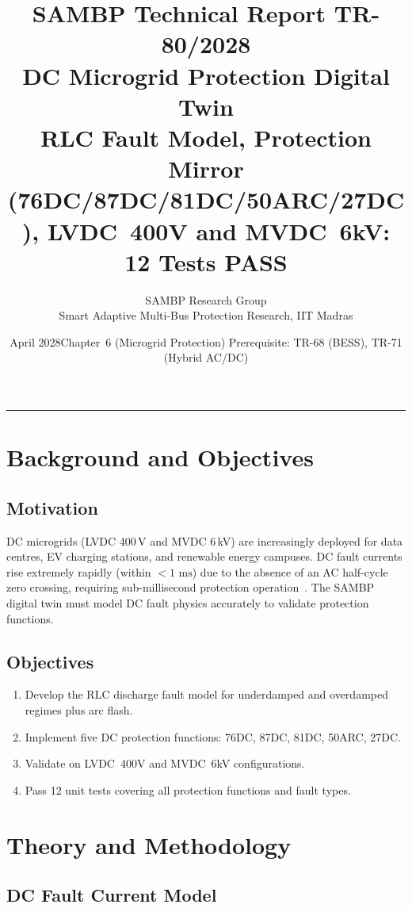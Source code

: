 \documentclass[11pt, a4paper]{article}
\title{\textbf{\textsf{\color{sambpblue}SAMBP Technical Report TR-80/2028}}\\[6pt]
  \Large DC Microgrid Protection Digital Twin\\[4pt]
  \normalsize RLC Fault Model, Protection Mirror (76DC/87DC/81DC/50ARC/27DC),
  LVDC~400V and MVDC~6kV: 12 Tests PASS}
\author{SAMBP Research Group\\[2pt]
  \small Smart Adaptive Multi-Bus Protection Research, IIT Madras}
\date{April 2028\quad\textbar\quad Chapter~6 (Microgrid Protection)\quad\textbar\quad
  Prerequisite: TR-68 (BESS), TR-71 (Hybrid AC/DC)}
\newcommand{\ms}{\,\text{ms}}
\begin{document}
\maketitle
\tableofcontents
\vspace{6pt}\hrule\vspace{10pt}

\section{Background and Objectives}
\label{sec:background}

\subsection{Motivation}

DC microgrids (LVDC 400\,V and MVDC 6\,kV) are increasingly deployed for
data centres, EV charging stations, and renewable energy campuses.
DC fault currents rise extremely rapidly (within $< 1\,\ms$) due to the
absence of an AC half-cycle zero crossing, requiring sub-millisecond
protection operation~\cite{Dragicevic2016}. The SAMBP digital twin must
model DC fault physics accurately to validate protection functions.

\subsection{Objectives}

\begin{enumerate}
  \item Develop the RLC discharge fault model for underdamped and overdamped
    regimes plus arc flash.
  \item Implement five DC protection functions: 76DC, 87DC, 81DC, 50ARC, 27DC.
  \item Validate on LVDC~400V and MVDC~6kV configurations.
  \item Pass 12 unit tests covering all protection functions and fault types.
\end{enumerate}

\section{Theory and Methodology}
\label{sec:theory}

\subsection{DC Fault Current Model}
\end{document}
